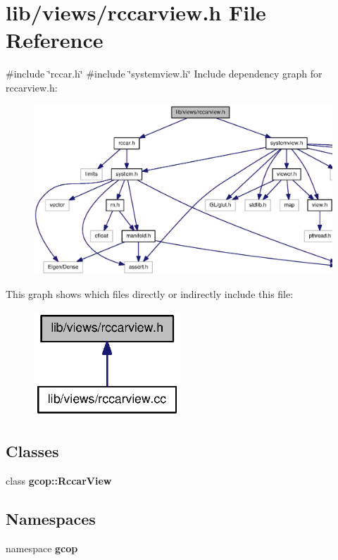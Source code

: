 \section{lib/views/rccarview.h \-File \-Reference}
\label{rccarview_8h}
{\ttfamily \#include \char`\"{}rccar.\-h\char`\"{}}\*
{\ttfamily \#include \char`\"{}systemview.\-h\char`\"{}}\*
\-Include dependency graph for rccarview.\-h\-:
\nopagebreak
\begin{figure}[H]
\begin{center}
\leavevmode
\includegraphics[width=350pt]{rccarview_8h__incl}
\end{center}
\end{figure}
\-This graph shows which files directly or indirectly include this file\-:
\nopagebreak
\begin{figure}[H]
\begin{center}
\leavevmode
\includegraphics[width=156pt]{rccarview_8h__dep__incl}
\end{center}
\end{figure}
\subsection*{\-Classes}
\begin{DoxyCompactItemize}
\item 
class {\bf gcop\-::\-Rccar\-View}
\end{DoxyCompactItemize}
\subsection*{\-Namespaces}
\begin{DoxyCompactItemize}
\item 
namespace {\bf gcop}
\end{DoxyCompactItemize}
